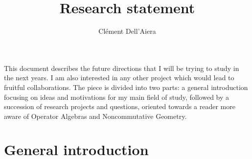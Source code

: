 \documentclass[a4paper]{article}
\title{Research statement}
\date{}
\author{ Cl\'ement Dell'Aiera}
\begin{document}
\maketitle

This document describes the future directions that I will be trying to study in the next years. I am also interested in any other project which would lead to fruitful collaborations. The piece is divided into two parts: a general introduction focusing on ideas and motivations for my main field of study, followed by a succession of research projects and questions, oriented towards a reader more aware of Operator Algebras and Noncommutative Geometry. 

\section{General introduction}




 
\end{document}
